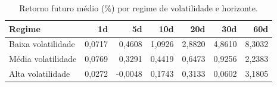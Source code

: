 \begin{table}[H]
\centering
\small
\caption{Retorno futuro médio (\%) por regime de volatilidade e horizonte.}
\label{tab:cap9_retornos_regimes}
\begin{tabular}{lrrrrrr}
\toprule
Regime & 1d & 5d & 10d & 20d & 30d & 60d \\
\midrule
Baixa volatilidade & 0,0717 & 0,4608 & 1,0926 & 2,8820 & 4,8610 & 8,3032 \\
Média volatilidade & 0,0769 & 0,3291 & 0,4419 & 0,6473 & 0,9256 & 2,2383 \\
Alta volatilidade & 0,0272 & -0,0048 & 0,1743 & 0,3133 & 0,0602 & 3,1805 \\
\bottomrule
\end{tabular}
\end{table}